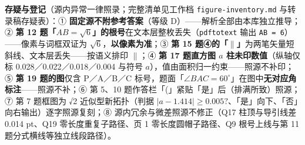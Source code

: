 \begin{gktip}
\textbf{存疑与登记}（源内异常一律照录；完整清单见工作档 \texttt{figure-inventory.md} 与转录稿存疑表）：① \textbf{固定源不附参考答案}（等级 D）——解析全部由本库独立推导；② \textbf{第 12 题「\(AB=\sqrt{6}\)」的根号}在文本层整枚丢失（\texttt{pdftotext} 输出 \texttt{AB = 6}）——像素与词框双证为 \(\sqrt{6}\)，\textbf{以像素为准}；③ \textbf{第 15 题④的「$\parallel$」}为两笔矢量短斜线、文本层丢失——按语义排印 \(\parallel\)；④ \textbf{第 17 题直方图 \(a\) 柱未印数值}（纵轴仅标 0.028／0.022／0.018／0.004 与符号 \(a\)），值由面积归一约束——照源不补印；⑤ \textbf{第 19 题的图}仅含 P／A／B／C 标号，题面「\(\angle BAC=60^{\circ}\)」在图中\textbf{无对应角标注}——照源不补；⑥ 第 5、10 题作答栏「(」紧贴「是」后（排满所致）照源；⑦ 第 7 题框图为 √2 近似型新拓扑（判据 \(|a-1.414|\geqslant 0.005?\)、「是」向下、「否」向右输出）逐字照源复刻；⑧ 源内冗余与微差照源不修正（Q17 柱顶与导引线差 0.014 pt、Q19 零长度重复子路径、页 1 零长度圆帽子路径、Q9 根号上线与第 11 题分式横线等独立线段路径）。
\end{gktip}



